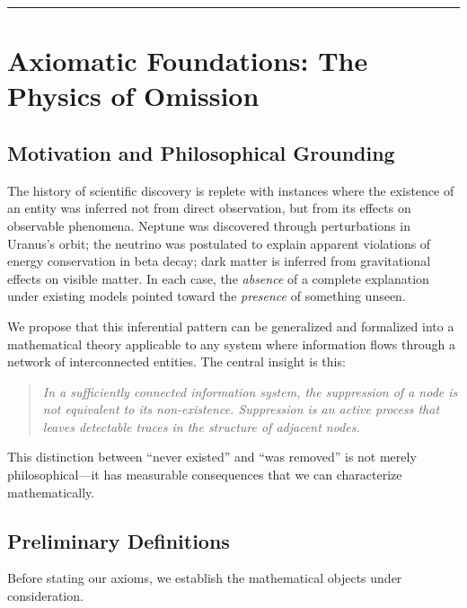 \documentclass[12pt,a4paper]{article}
\theoremstyle{definition}
\theoremstyle{remark}
\begin{document}
\vspace{2em}
\hrule
\vspace{2em}


\section{Axiomatic Foundations: The Physics of Omission}

\subsection{Motivation and Philosophical Grounding}

The history of scientific discovery is replete with instances where the existence of an entity was inferred not from direct observation, but from its effects on observable phenomena. Neptune was discovered through perturbations in Uranus's orbit; the neutrino was postulated to explain apparent violations of energy conservation in beta decay; dark matter is inferred from gravitational effects on visible matter. In each case, the \emph{absence} of a complete explanation under existing models pointed toward the \emph{presence} of something unseen.

We propose that this inferential pattern can be generalized and formalized into a mathematical theory applicable to any system where information flows through a network of interconnected entities. The central insight is this:

\begin{quote}
\textit{In a sufficiently connected information system, the suppression of a node is not equivalent to its non-existence. Suppression is an active process that leaves detectable traces in the structure of adjacent nodes.}
\end{quote}

This distinction between ``never existed'' and ``was removed'' is not merely philosophical—it has measurable consequences that we can characterize mathematically.

\subsection{Preliminary Definitions}

Before stating our axioms, we establish the mathematical objects under consideration.
\end{document}

